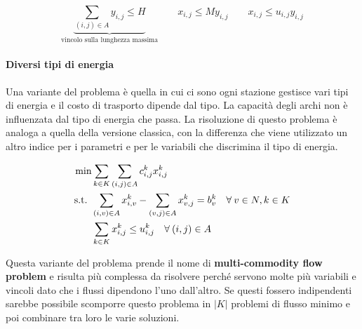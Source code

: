 $$
\underbrace{\sum\limits_{(i,j) \in A} y_{i,j} \leq H}_{\text{vincolo sulla lunghezza massima}} \qquad x_{i,j}\leq M y_{i,j} \qquad x_{i,j} \leq u_{i,j} y_{i,j}
$$

\paragraph{Diversi tipi di energia} Una variante del problema è quella in cui ci sono ogni stazione gestisce vari tipi di energia e il costo di trasporto dipende dal tipo. La capacità degli archi non è influenzata dal tipo di energia che passa.
La risoluzione di questo problema è analoga a quella della versione classica, con la differenza che viene utilizzato un altro indice per i parametri e per le variabili che discrimina il tipo di energia.

\begin{align*}
	\min & \sum\limits_{k \in K}\sum\limits_{(i,j) \in A} c_{i,j}^k x_{i,j}^k \\
	\text{s.t. } & \sum\limits_{(i,v) \in A}x_{i,v}^k - \sum\limits_{(v,j) \in A}x_{v,j}^k = b_{v}^k \quad\forall \: v \in N, k \in K\\
	& \sum\limits_{k \in K} x_{i,j}^k \leq u_{i,j}^k \quad\forall \: (i,j) \in A
\end{align*}

\noindent Questa variante del problema prende il nome di \textbf{multi-commodity flow problem} e risulta più complessa da risolvere perché servono molte più variabili e vincoli dato che i flussi dipendono l'uno dall'altro. Se questi fossero indipendenti sarebbe possibile scomporre questo problema in $|K|$ problemi di flusso minimo e poi combinare tra loro le varie soluzioni.



